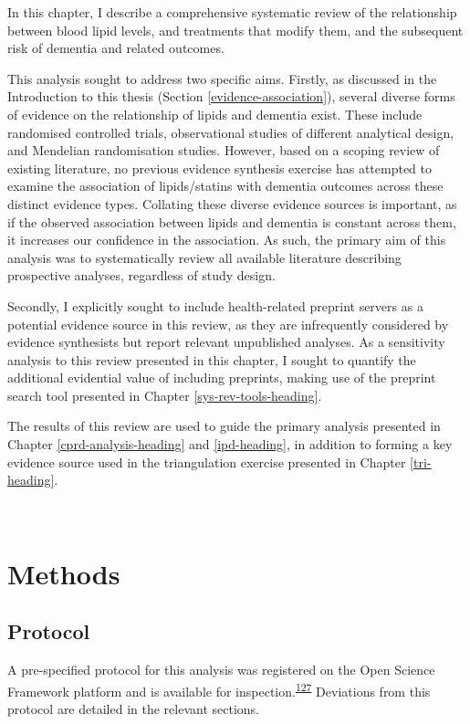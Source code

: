 \documentclass[a4paper, twoside]{templates/ociamthesis}
\begin{document}
In this chapter, I describe a comprehensive systematic review of the relationship between blood lipid levels, and treatments that modify them, and the subsequent risk of dementia and related outcomes.

This analysis sought to address two specific aims. Firstly, as discussed in the Introduction to this thesis (Section \ref{evidence-association}), several diverse forms of evidence on the relationship of lipids and dementia exist. These include randomised controlled trials, observational studies of different analytical design, and Mendelian randomisation studies. However, based on a scoping review of existing literature, no previous evidence synthesis exercise has attempted to examine the association of lipids/statins with dementia outcomes across these distinct evidence types. Collating these diverse evidence sources is important, as if the observed association between lipids and dementia is constant across them, it increases our confidence in the association. As such, the primary aim of this analysis was to systematically review all available literature describing prospective analyses, regardless of study design.

Secondly, I explicitly sought to include health-related preprint servers as a potential evidence source in this review, as they are infrequently considered by evidence synthesists but report relevant unpublished analyses. As a sensitivity analysis to this review presented in this chapter, I sought to quantify the additional evidential value of including preprints, making use of the preprint search tool presented in Chapter \ref{sys-rev-tools-heading}.

The results of this review are used to guide the primary analysis presented in Chapter \ref{cprd-analysis-heading} and \ref{ipd-heading}, in addition to forming a key evidence source used in the triangulation exercise presented in Chapter \ref{tri-heading}.

~

\hypertarget{methods}{%
\section{Methods}\label{methods}}

\hypertarget{protocol}{%
\subsection{Protocol}\label{protocol}}

A pre-specified protocol for this analysis was registered on the Open Science Framework platform and is available for inspection.\textsuperscript{\protect\hyperlink{ref-mcguinnessluke2020}{127}} Deviations from this protocol are detailed in the relevant sections.
\end{document}
